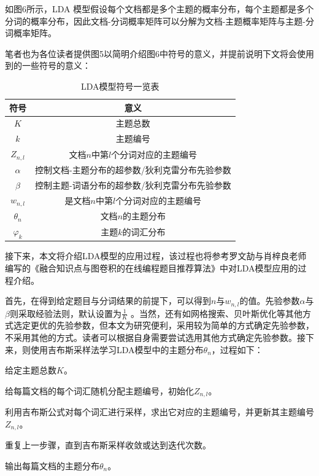 如图6所示，LDA 模型假设每个文档都是多个主题的概率分布，每个主题都是多个分词的概率分布，因此文档-分词概率矩阵可以分解为文档-主题概率矩阵与主题-分词概率矩阵。

笔者也为各位读者提供图5以简明介绍图6中符号的意义，并提前说明下文将会使用到的一些符号的意义：

\begin{table}[htbp]
    \centering
    \label{table041937}
    \caption{LDA模型符号一览表}
    \begin{tabular}{@{}cc@{}}
    \toprule
    符号            & 意义                        \\ \midrule
    $K$           & 主题总数                      \\
    $k$           & 主题编号                      \\
    $Z_{n,l}$     & 文档$n$中第$l$个分词对应的主题编号      \\
    $\alpha$      & 控制文档-主题分布的超参数/狄利克雷分布先验参数 \\
    $\beta$       & 控制主题-词语分布的超参数/狄利克雷分布先验参数 \\
    $w_{n,l}$     & 是文档$n$中第$l$个分词对应的主题编号     \\
    $\theta _{n}$ & 文档$n$的主题分布                \\
    $\varphi_{k}$ & 主题$k$的词汇分布                \\ \bottomrule
    \end{tabular}
\end{table}

接下来，本文将介绍LDA模型的应用过程，该过程也将参考罗文劼与肖梓良老师编写的《融合知识点与图卷积的在线编程题目推荐算法》\cite{LuoRongHeZhiShiDianYuTuJuanJiDeZaiXianBianChengTiMuTuiJianSuanFa}中对LDA模型应用的过程介绍。

首先，在得到给定题目与分词结果的前提下，可以得到$n$与$w_{n,l}$的值。先验参数$\alpha$与$\beta$则采取经验法则，默认设置为$\frac{1}{K}$ 。当然，还有如网格搜索、贝叶斯优化等其他方式选定更优的先验参数，但本文为研究便利，采用较为简单的方式确定先验参数，不采用其他的方式。读者可以根据自身需要尝试选用其他方式确定先验参数。接下来，则使用吉布斯采样法学习LDA模型中的主题分布$\theta _{n}$，过程如下：

\begin{mgAlgorithm}[吉布采样学习LDA模型过程]
    \item 给定主题总数$K$。
    \item 给每篇文档的每个词汇随机分配主题编号，初始化$Z_{n,l}$。
    \item 利用吉布斯公式对每个词汇进行采样，求出它对应的主题编号，并更新其主题编号$Z_{n,l}$。
    \item 重复上一步骤，直到吉布斯采样收敛或达到迭代次数。
    \item 输出每篇文档的主题分布$\theta _{n}$。
\end{mgAlgorithm}

